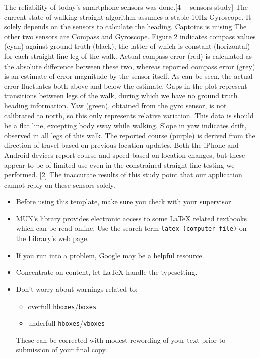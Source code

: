 The reliability of today’s smartphone sensors was done.[4----sensors study] The current state of walking straight algorithm assumes a stable 10Hz Gyroscope. It solely depends on the sensors to calculate the heading.  
Captoins is mising
The other two sensors are Compass and Gyroscope. Figure 2 indicates compass values (cyan) against ground truth (black), the latter of which is constant (horizontal) for each straight-line leg of the walk. Actual compass error (red) is calculated as the absolute difference between these two, whereas reported compass error (grey) is an estimate of error magnitude by the sensor itself. As can be seen, the actual error fluctuates both above and below the estimate. Gaps in the plot represent transitions between legs of the walk, during which we have no ground truth heading information.
Yaw (green), obtained from the gyro sensor, is not calibrated to north, so this only represents relative variation. This data is should be a flat line, excepting body sway while walking. Slope in yaw indicates drift, observed in all legs of this walk. The reported course (purple) is derived from the direction of travel based on previous location updates. Both the iPhone and Android devices report course and speed based on location changes, but these appear to be of limited use even in the constrained straight-line testing we performed. [2] The inaccurate results of this study point that our application cannot reply on these sensors solely.

\begin{itemize}
	\item Before using this template, make sure you check with
		your supervisor.
	\item MUN's library provides electronic access to some \LaTeX{}
		related textbooks which can be read online.  Use
		the search term \texttt{latex (computer file)} on the
		Library's web page.
	\item If you run into a problem, Google may be a helpful resource.
	\item Concentrate on content, let \LaTeX{} handle the typesetting.
	\item Don't worry about warnings related to:
	\begin{itemize}
		\item overfull \texttt{hboxes}/\texttt{boxes}
		\item underfull \texttt{hboxes}/\texttt{vboxes}
	\end{itemize}
	These can be corrected with modest rewording of your text prior
	to submission of your final copy.
\end{itemize}

